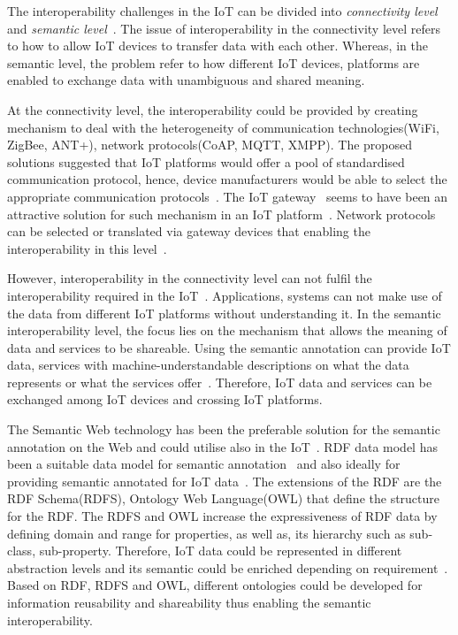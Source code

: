 The interoperability challenges in the IoT can be divided into \textit{connectivity level} and \textit{semantic level}~\citep{Kiljander:2014}.
The issue of interoperability in the connectivity level refers to how to allow IoT devices to transfer data with each other.
Whereas, in the semantic level, the problem refer to how different IoT devices, platforms are enabled to exchange data with unambiguous and shared meaning.

At the connectivity level, the interoperability could be provided by creating mechanism to deal with the heterogeneity of communication technologies(WiFi, ZigBee, ANT+), network protocols(CoAP, MQTT, XMPP). 
The proposed solutions suggested that IoT platforms would offer a pool of standardised communication protocol, hence, device 
manufacturers would be able to select the appropriate communication protocols~\citep{Noura:2017}.
The IoT gateway~\citep{Zhu:2010} seems to have been an attractive solution for such mechanism in an IoT platform~\citep{DaXu:2014}.
Network protocols can be selected or translated via gateway devices that enabling the interoperability in this level~\citep{Bandyopadhyay:2013}. 

However, interoperability in the connectivity level can not fulfil the interoperability required in the IoT~\citep{Kiljander:2014}.
Applications, systems can not make use of the data from different IoT platforms without understanding it. 
In the semantic interoperability level, the focus lies on the mechanism that allows the meaning of data and services to be shareable.
Using the semantic annotation can provide IoT data, services with machine-understandable descriptions on what the data represents or what the services offer~\citep{IERC:2013}.
Therefore, IoT data and services can be exchanged among IoT devices and crossing IoT platforms. 

The Semantic Web technology has been the preferable solution for the semantic annotation on the Web and could utilise also in the IoT~\citep{Jara:2014,Noura:2017}. 
RDF data model has been a suitable data model for semantic annotation~\citep{Oren:2014} and also ideally for providing semantic annotated for IoT data~\citep{Wei:2009}.
The extensions of the RDF are the RDF Schema(RDFS), Ontology Web Language(OWL) that define the structure for the RDF.
The RDFS and OWL increase the expressiveness of RDF data by defining domain and range for properties, as well as, its hierarchy such as sub-class, sub-property.
Therefore, IoT data could be represented in different abstraction levels and its semantic could be enriched depending on requirement~\citep{IERC:2013}.
Based on RDF, RDFS and OWL, different ontologies could be developed for information reusability and shareability thus enabling the semantic interoperability. 

